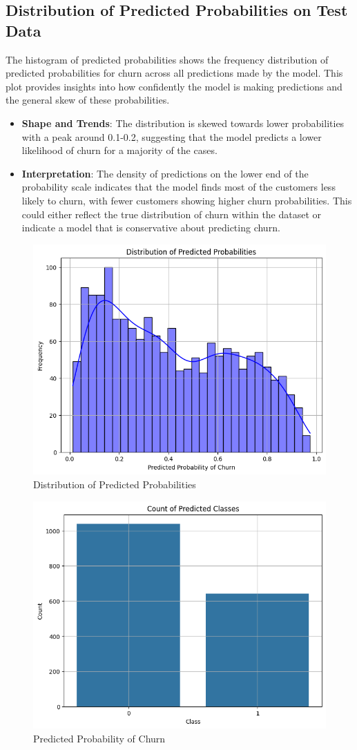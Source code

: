 \documentclass{article}
\begin{document}
\subsection{ Distribution of Predicted Probabilities on Test Data}

The histogram of predicted probabilities shows the frequency distribution of predicted probabilities for churn across all predictions made by the model. This plot provides insights into how confidently the model is making predictions and the general skew of these probabilities.
\begin{itemize}


    

\item  \textbf{Shape and Trends}: The distribution is skewed towards lower probabilities with a peak around 0.1-0.2, suggesting that the model predicts a lower likelihood of churn for a majority of the cases.
\item  \textbf{Interpretation}: The density of predictions on the lower end of the probability scale indicates that the model finds most of the customers less likely to churn, with fewer customers showing higher churn probabilities. This could either reflect the true distribution of churn within the dataset or indicate a model that is conservative about predicting churn.
\end{itemize}



\begin{figure}[h]
\centering
\includegraphics[width=0.4\linewidth]{ass.png}
\caption{Distribution of Predicted Probabilities}
\label{fig:distribution}
\end{figure}

\begin{figure}[h]
\centering
\includegraphics[width=0.4\linewidth]{count of preit.png}
\caption{Predicted Probability of Churn}
\label{fig:distribution}
\end{figure}
\end{document}
